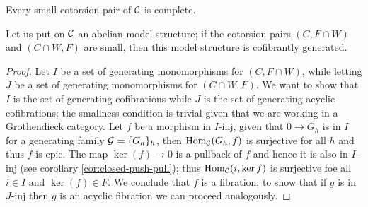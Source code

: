 \begin{corollary}
	Every small cotorsion pair of $\mathcal{C}$ is complete.
\end{corollary}







\begin{proposition}
	Let us put on $\mathcal{C}$ an abelian model structure; if the cotorsion pairs $(C, F \cap W)$ and $(C\cap W, F)$ are small, then this model structure is cofibrantly generated.
\end{proposition}

\begin{proof}
	Let $I$ be a set of generating monomorphisms for $(C, F \cap W)$, while letting $J$ be a set of generating monomorphisms for $(C \cap W, F)$. We want to show that $I$ is the set of generating cofibrations while $J$ is the set of generating acyclic cofibrations; the smallness condition is trivial given that we are working in a Grothendieck category. Let $f$ be a morphism in $I$-inj, given that $0\longrightarrow G_h$ is in $I$ for a generating family $\mathcal{G} = \{G_h\}_h$, then $\mathrm{Hom}_{\mathcal{C}}(G_h, f)$ is surjective for all $h$ and thus $f$ is epic. The map $\ker(f)\longrightarrow 0$ is a pullback of $f$ and hence it is also in $I$-inj (see corollary \ref{cor:closed-push-pull}); thus $\mathrm{Hom}_{\mathcal{C}}(i, \ker{f})$ is surjective foe all $i \in I$ and $\ker(f) \in F$. We conclude that $f$ is a fibration; to show that if $g$ is in $J$-inj then $g$ is an acyclic fibration we can proceed analogously. 
\end{proof}


